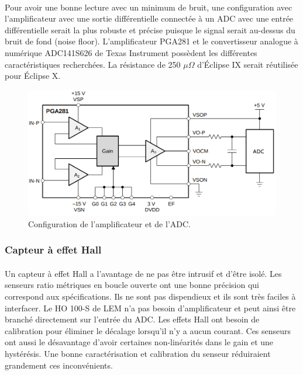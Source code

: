 	\paragraph*{}
	Pour avoir une bonne lecture avec un minimum de bruit, une configuration avec l'amplificateur avec une sortie différentielle connectée à un ADC avec une entrée différentielle serait la plus robuste et précise puisque le signal serait au-dessus du bruit de fond (noise floor). L'amplificateur PGA281 et le convertisseur analogue à numérique ADC141S626 de Texas Instrument possèdent les différentes caractéristiques recherchées. La résistance de 250 $\mu \Omega$ d'Éclipse IX serait réutilisée pour Éclipse X.
	
	\begin{figure}[H]
		\centering
		\includegraphics[scale = 0.4]{Images/current_sense_shunt.png}
		\caption{Configuration de l'amplificateur et de l'ADC.}
		\label{fig:current_sense_shunt}
	\end{figure}
	
	\subsubsection*{Capteur à effet Hall}
	\paragraph*{}	
	Un capteur à effet Hall a l'avantage de ne pas être intrusif et d'être isolé. Les senseurs ratio métriques en boucle ouverte ont une bonne précision qui correspond aux spécifications. Ils ne sont pas dispendieux et ils sont très faciles à interfacer. Le HO 100-S de LEM n'a pas besoin d'amplificateur et peut ainsi être branché directement sur l'entrée du ADC. Les effets Hall ont besoin de calibration pour éliminer le décalage lorsqu'il n'y a aucun courant. Ces senseurs ont aussi le désavantage d'avoir certaines non-linéarités dans le gain et une hystérésis. Une bonne caractérisation et calibration du senseur réduiraient grandement ces inconvénients.
	
